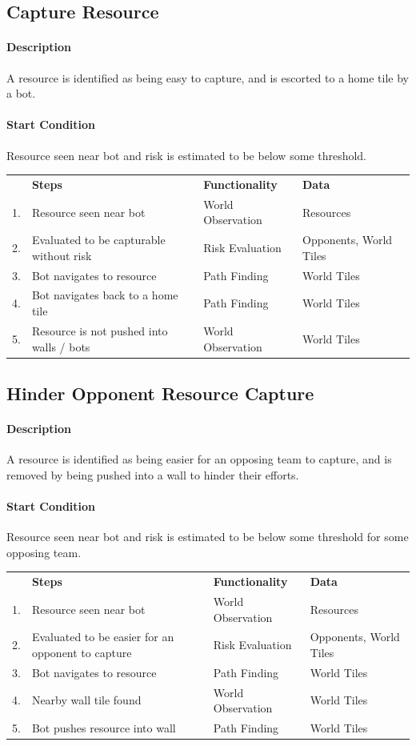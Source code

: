 \documentclass[a4paper,10pt]{article}
\begin{document}
\newcommand{\scenario}[4]{
  \subsection{#1}
  \paragraph{Description}
  #2

  \vspace{-3mm}
  \paragraph{Start Condition}
  #3

  \vspace{2mm}
  \begin{center}
  \begin{tabular}{r l l l}
    ~ & \textbf{Steps} & \textbf{Functionality} & \textbf{Data} \\
    #4
  \end{tabular}
  \end{center}
}

\scenario{Capture Resource}{
  A resource is identified as being easy to capture, and is escorted to a home tile by a bot.
}{
  Resource seen near bot and risk is estimated to be below some threshold.
}{
  1. & Resource seen near bot & World Observation & Resources \\
  2. & Evaluated to be capturable without risk & Risk Evaluation & Opponents, World Tiles \\
  3. & Bot navigates to resource & Path Finding & World Tiles \\
  4. & Bot navigates back to a home tile & Path Finding & World Tiles \\
  5. & Resource is not pushed into walls / bots & World Observation & World Tiles \\
}

\scenario{Hinder Opponent Resource Capture}{
  A resource is identified as being easier for an opposing team to capture, and is removed by being pushed into a wall to hinder their efforts.
}{
  Resource seen near bot and risk is estimated to be below some threshold for some opposing team.
}{
  1. & Resource seen near bot & World Observation & Resources \\
  2. & Evaluated to be easier for an opponent to capture & Risk Evaluation & Opponents, World Tiles \\
  3. & Bot navigates to resource & Path Finding & World Tiles \\
  4. & Nearby wall tile found & World Observation & World Tiles \\
  5. & Bot pushes resource into wall & Path Finding & World Tiles \\
}
\end{document}
